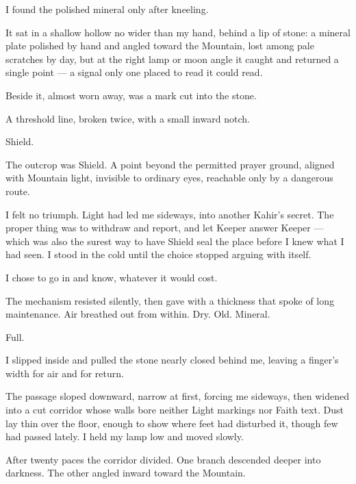 I found the polished mineral only after kneeling.\par

It sat in a shallow hollow no wider than my hand, behind a lip of stone: a mineral plate polished by hand and angled toward the Mountain, lost among pale scratches by day, but at the right lamp or moon angle it caught and returned a single point --- a signal only one placed to read it could read.\par

Beside it, almost worn away, was a mark cut into the stone.\par

A threshold line, broken twice, with a small inward notch.\par

Shield.\par

The outcrop was Shield. A point beyond the permitted prayer ground, aligned with Mountain light, invisible to ordinary eyes, reachable only by a dangerous route.\par

I felt no triumph. Light had led me sideways, into another Kahir's secret. The proper thing was to withdraw and report, and let Keeper answer Keeper --- which was also the surest way to have Shield seal the place before I knew what I had seen. I stood in the cold until the choice stopped arguing with itself.\par

I chose to go in and know, whatever it would cost.\par

The mechanism resisted silently, then gave with a thickness that spoke of long maintenance. Air breathed out from within. Dry. Old. Mineral.\par

Full.\par

I slipped inside and pulled the stone nearly closed behind me, leaving a finger's width for air and for return.\par

The passage sloped downward, narrow at first, forcing me sideways, then widened into a cut corridor whose walls bore neither Light markings nor Faith text. Dust lay thin over the floor, enough to show where feet had disturbed it, though few had passed lately. I held my lamp low and moved slowly.\par

After twenty paces the corridor divided. One branch descended deeper into darkness. The other angled inward toward the Mountain.\par

